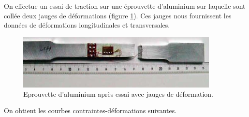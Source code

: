 \documentclass[lecture.tex]{subfiles}
\begin{document}

On effectue un essai de traction sur une éprouvette d’aluminium sur laquelle sont
collée deux jauges de déformations (figure \ref{figA}). Ces jauges nous fournissent les données de
déformations longitudinales et transversales.

\bigskip

\begin{figure}[h!]
  \begin{center}
    \includegraphics[scale=0.5]{figA0018.png}
  \end{center}
  \caption{Eprouvette d’aluminium après essai avec jauges de déformation.}
  \label{figA}
\end{figure}

\bigskip

On obtient les courbes contraintes-déformations suivantes.

\bigskip
\end{document}
